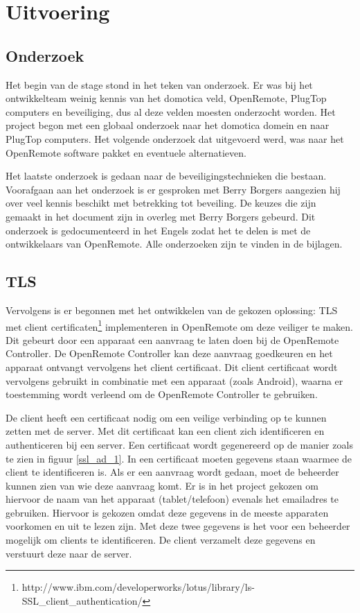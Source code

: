 \documentclass[]{article}
\begin{document}
\section{Uitvoering}

\subsection{Onderzoek}

Het begin van de stage stond in het teken van onderzoek. Er was bij het
ontwikkelteam weinig kennis van het domotica veld, OpenRemote, PlugTop computers
en beveiliging, dus al deze velden moesten onderzocht worden. Het project begon
met een globaal onderzoek naar het domotica domein en naar PlugTop computers. Het
volgende onderzoek dat uitgevoerd werd, was naar het OpenRemote software pakket en
eventuele alternatieven.

Het laatste onderzoek is gedaan naar de beveiligingstechnieken die bestaan.
Voorafgaan aan het onderzoek is er gesproken met Berry Borgers
aangezien hij over veel kennis beschikt met betrekking tot beveiling. De keuzes
die zijn gemaakt in het document zijn in overleg met Berry Borgers gebeurd. Dit
onderzoek is gedocumenteerd in het Engels zodat het te delen is met de
ontwikkelaars van OpenRemote. Alle onderzoeken zijn  te vinden in de bijlagen.

\subsection{TLS}
Vervolgens is er begonnen met het ontwikkelen van de gekozen oplossing:
TLS met client
certificaten\footnote{http://www.ibm.com/developerworks/lotus/library/ls-SSL\_client\_authentication/} implementeren in OpenRemote om deze veiliger te maken. Dit gebeurt
door een apparaat een aanvraag te laten doen bij de OpenRemote Controller. De
OpenRemote Controller kan deze aanvraag goedkeuren en het apparaat ontvangt
vervolgens het client certificaat. Dit client certificaat wordt vervolgens
gebruikt in combinatie met een apparaat (zoals Android), waarna er toestemming
wordt verleend om de OpenRemote Controller te gebruiken.

De client heeft een certificaat nodig om een veilige verbinding op te kunnen
zetten met de server. Met dit certificaat kan een client zich identificeren en
authenticeren bij een server. Een certificaat wordt gegenereerd op de manier
zoals te zien in figuur \ref{ssl_ad_1}. In een certificaat moeten gegevens staan
waarmee de client te identificeren is. Als er een aanvraag wordt gedaan, moet de
beheerder kunnen zien van wie deze aanvraag komt. Er is in het project gekozen
om hiervoor de naam van het apparaat (tablet/telefoon) evenals het emailadres te
gebruiken. Hiervoor is gekozen omdat deze gegevens in de meeste apparaten
voorkomen en uit te lezen zijn. Met deze twee gegevens is het voor een beheerder
mogelijk om clients te identificeren.  De client verzamelt deze gegevens en verstuurt deze naar de server. 
\end{document}

